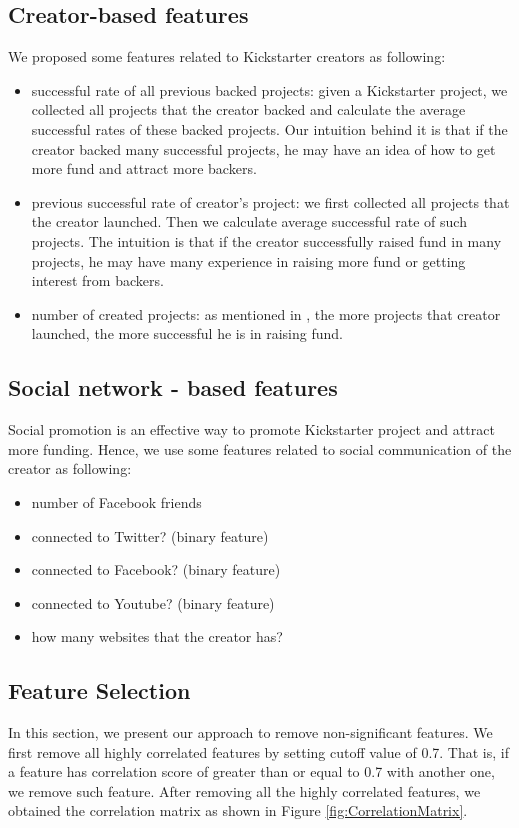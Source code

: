 \subsection{Creator-based features}
We proposed some features related to Kickstarter creators as following:
\begin{itemize}
	\item successful rate of all previous backed projects: given a Kickstarter project, we collected all projects that the creator backed and calculate the average successful rates of these backed projects. Our intuition behind it is that if the creator backed many successful projects, he may have an idea of how to get more fund and attract more backers.
	\item previous successful rate of creator's project: we first collected all projects that the creator launched. Then we calculate average successful rate of such projects. The intuition is that if the creator successfully raised fund in many projects, he may have many experience in raising more fund or getting interest from backers.
	\item number of created projects: as mentioned in \cite{chung2015long}, the more projects that creator launched, the more successful he is in raising fund.
\end{itemize}
\subsection{Social network - based features}
Social promotion is an effective way to promote Kickstarter project and attract more funding. Hence, we use some features related to social communication of the creator as following:
\begin{itemize}
	\item number of Facebook friends
	\item connected to Twitter? (binary feature)
	\item connected to Facebook? (binary feature)
	\item connected to Youtube? (binary feature)
	\item how many websites that the creator has?
\end{itemize}
\subsection{Feature Selection}
In this section, we present our approach to remove non-significant features. We first remove all highly correlated features by setting cutoff value of 0.7. That is, if a feature has correlation score of greater than or equal to 0.7 with another one, we remove such feature. After removing all the highly correlated features, we obtained the correlation matrix as shown in Figure \ref{fig:CorrelationMatrix}. 

